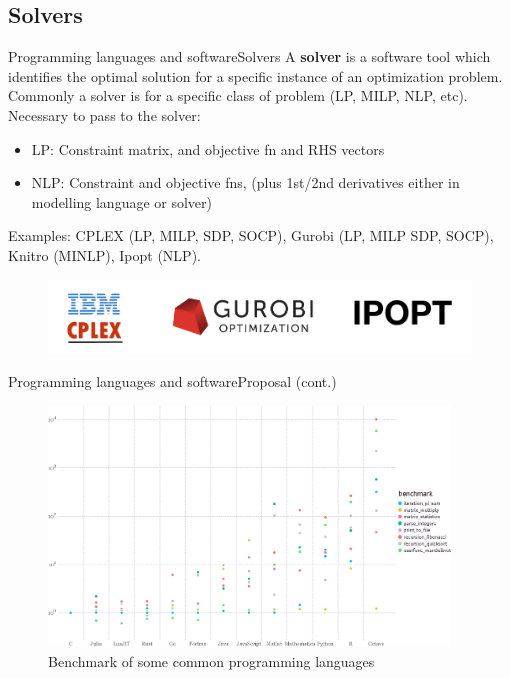 \documentclass[handout]{beamer}
\begin{document}
\subsection{Solvers}
\begin{frame}{Programming languages and software}{Solvers}
A \textbf{solver} is a software tool which identifies the optimal solution for a specific instance of an optimization problem.
Commonly a solver is for a specific class of problem (LP, MILP, NLP, etc).\\[6pt]

Necessary to pass to the solver:
\begin{itemize}
    \item LP: Constraint matrix, and objective fn and RHS vectors
    \item NLP: Constraint and objective fns, (plus 1st/2nd derivatives either in modelling language or solver)
\end{itemize}

Examples: CPLEX (LP, MILP, SDP, SOCP), Gurobi (LP, MILP SDP, SOCP), Knitro (MINLP), Ipopt (NLP).

\begin{figure}
\begin{center}
\includegraphics[width=.75\textwidth]{Solvers.png}
\end{center}
\end{figure}



\end{frame}


\begin{frame}[t]{Programming languages and software}{Proposal (cont.)}
  \begin{figure}
  \begin{center}
  \includegraphics[width=0.95\textwidth]{benchmarks.eps}
  \end{center}
  \caption{Benchmark of some common programming languages}\label{fig:speed}
  \end{figure}

\end{frame}
\end{document}
